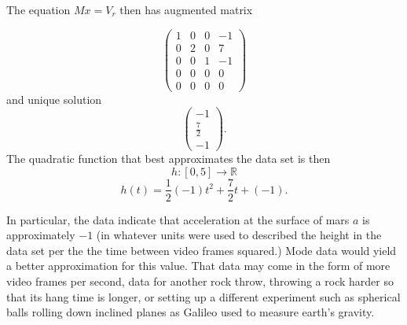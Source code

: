 \documentclass[12pt]{article}
\def\R{{\mathbb{R}}}
\def\bv{\left(\begin{array}{c}}
\def\ev{\end{array}\right) }
\begin{document}
The equation $Mx=V_r$ then has augmented matrix 

$$
\left( \begin{array}{rrr|r}
1 &0&0&-1\\
0      &2&0&7\\
0&0&1&-1\\
0&0&0&0\\
0&0&0&0
\end{array} \right)
$$
and unique solution 
$$\bv -1\\ \frac72 \\-1 \ev. $$
The quadratic function that best approximates the data set is then 
$$ h:[0,5] \to \R$$
$$h(t)=\frac12 (-1) t^2 +\frac72 t +(-1).$$

In particular, the data indicate that acceleration at the surface of mars $a$ is approximately $-1$ (in whatever units were used to described the height in the data set per the the time between video frames squared.) Mode data would yield a better approximation for this value. That data may come in the form of more video frames per second, data for another rock throw, throwing a rock harder so that its hang time is longer, or setting up a different experiment such as spherical balls rolling down inclined planes as Galileo used to measure earth's gravity. 
\end{document}
